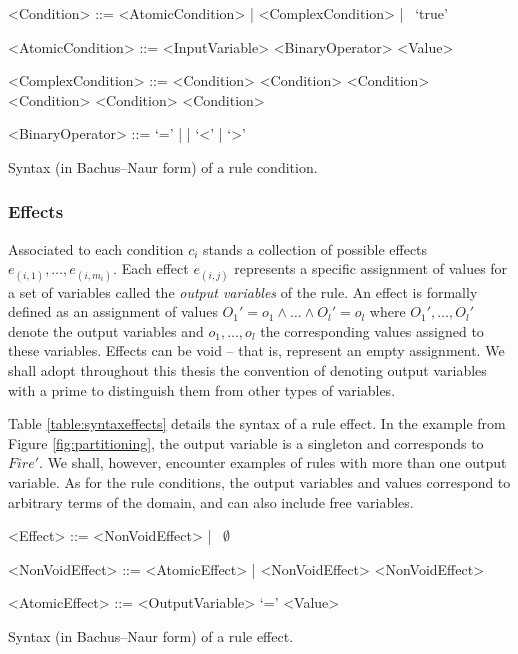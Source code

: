 \setlength{\grammarindent}{12em} 

\begin{table}[h]
\vspace{3mm}
\begin{grammar}

<Condition> ::= <AtomicCondition> | <ComplexCondition> | \ `true'

<AtomicCondition> ::= <InputVariable> <BinaryOperator> <Value>

<ComplexCondition> ::= \lit{(} <Condition> \lit{)} 
\alt \lit{$\lnot$} <Condition> 
\alt <Condition> \lit{$\land$} <Condition> 
\alt <Condition> \lit{$\lor$} <Condition>

<BinaryOperator> ::= `=' | \lit{$\neq$} | `\textless' | `\textgreater'

\end{grammar} \vspace{-2mm}
\caption{Syntax (in Bachus--Naur form) of a rule condition.}
\label{table:syntaxconditions}
\end{table}

\subsubsection*{Effects}

Associated to each condition $c_i$ stands a collection of possible effects $e_{(i,1)}, \dots, e_{(i,m_i)}$. Each effect $e_{(i,j)}$ represents a specific assignment of values for a set of variables called the \textit{output variables} of the rule.  An effect is formally defined as an assignment of values $O_1'\!=\!o_1 \land \dots \land O_{l}'\!=\!o_{l}$ where $O_1', \dots, O_{l}'$ denote the output variables and $o_1, \dots, o_{l}$ the corresponding values assigned to these variables. Effects can be void -- that is, represent an empty assignment. We shall adopt throughout this thesis the convention of denoting output variables with a prime to distinguish them from other types of variables. 

Table \ref{table:syntaxeffects} details the syntax of a rule effect. In the example from Figure \ref{fig:partitioning}, the output variable is a singleton and corresponds to $Fire'$. We shall, however, encounter examples of rules with more than one output variable. As for the rule conditions, the output variables and values correspond to arbitrary terms of the domain, and can also include free variables. 


\begin{table}[h]
\vspace{3mm}
\begin{grammar}

<Effect> ::= <NonVoidEffect> | \ $\emptyset$

<NonVoidEffect> ::= <AtomicEffect> | <NonVoidEffect> \lit{$\land$} <NonVoidEffect> 

<AtomicEffect> ::= <OutputVariable> `=' <Value>

\end{grammar} \vspace{-2mm}
\caption{Syntax (in Bachus--Naur form) of a rule effect.}
\label{table:syntaxeffects}
\end{table}

